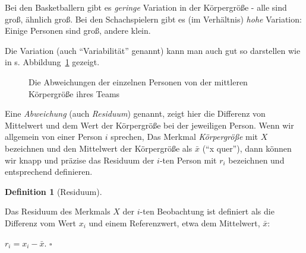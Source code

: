 \documentclass[
  a4paper,
  DIV=11]{scrreprt}
\theoremstyle{definition}
\theoremstyle{definition}
\theoremstyle{definition}
\newtheorem{definition}{Definition}[chapter]
\theoremstyle{remark}
\begin{document}
Bei den Basketballern gibt es \emph{geringe} Variation in der
Körpergröße - alle sind groß, ähnlich groß. Bei den Schachspielern gibt
es (im Verhältnis) \emph{hohe} Variation: Einige Personen sind groß,
andere klein.

Die Variation (auch ``Variabilität'' genannt) kann man auch gut so
darstellen wie in s. Abbildung~\ref{fig-variab} gezeigt.

\begin{figure}


\caption{\label{fig-variab}Die Abweichungen der einzelnen Personen von
der mittleren Körpergröße ihres Teams}

\end{figure}%

Eine \emph{Abweichung} (auch \emph{Residuum}) genannt, zeigt hier die
Differenz von Mittelwert und dem Wert der Körpergröße bei der jeweiligen
Person. Wenn wir allgemein von einer Person \(i\) sprechen, Das Merkmal
\emph{Körpergröße} mit \(X\) bezeichnen und den Mittelwert der
Körpergröße als \(\bar{x}\) (``x quer''), dann können wir knapp und
präzise das Residuum der \(i\)-ten Person mit \(r_i\) bezeichnen und
entsprechend definieren.

\begin{definition}[Residuum]\protect\hypertarget{def-residuum}{}\label{def-residuum}

Das Residuum des Merkmals \(X\) der \(i\)-ten Beobachtung ist definiert
als die Differenz vom Wert \(x_i\) und einem Referenzwert, etwa dem
Mittelwert, \(\bar{x}\):

\(r_i = x_i - \bar{x}\). \(\square\)

\end{definition}
\end{document}
